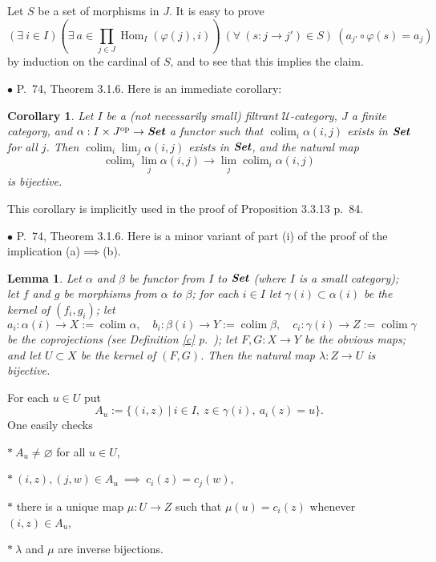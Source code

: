 \documentclass[12pt]{article}
\newtheorem{lem}[thm]{Lemma}
\newtheorem{cor}[thm]{Corollary}
\theoremstyle{remark}%
\newcommand{\bu}{\bullet}
\newcommand{\n}{\noindent}
\newcommand{\U}{\mathcal U}
\newcommand{\p}{\varphi}
\DeclareMathOperator*{\coli}{colim}
\DeclareMathOperator{\h}{Hom}
\DeclareMathOperator{\op}{op}
\begin{document}
Let $S$ be a set of morphisms in $J$. It is easy to prove 
$$
(\exists\ i\in I)\left(\exists\ a\in\prod_{j\in J}\h_I(\p(j),i)\right)\ (\forall\ (s:j\to j')\in S)\ (a_{j'}\circ\p(s)=a_j) 
$$ 
by induction on the cardinal of $S$, and to see that this implies the claim. 


\n$\bu$ P.~74, Theorem 3.1.6. Here is an immediate corollary: 
%
\begin{cor}\label{316}
Let $I$ be a (not necessarily small) filtrant $\U$-category, $J$ a finite category, and $\alpha:I\times J^{\op}\to\textbf{\em Set}$ a functor such that $\coli_i\alpha(i,j)$ exists in $\textbf{\em Set}$ for all $j$. Then $\coli_i\lim_j\alpha(i,j)$ exists in $\textbf{\em Set}$, and the natural map 
$$
\coli_i\lim_j\alpha(i,j)\to
\lim_j\coli_i\alpha(i,j)
$$ 
is bijective. 
\end{cor}
%
This corollary is implicitly used in the proof of Proposition 3.3.13 p.~84. 


\n$\bu$ P.~74, Theorem 3.1.6. Here is a minor variant of part (i) of the proof of the implication (a)$\implies$(b).\smallskip 

\begin{lem} 
Let $\alpha$ and $\beta$ be functor from $I$ to $\textbf{\em Set}$ (where $I$ is a small category); let $f$ and $g$ be morphisms from $\alpha$ to $\beta$; for each $i\in I$ let $\gamma(i)\subset\alpha(i)$ be the kernel of $(f_i,g_i)$; let 
$$
a_i:\alpha(i)\to X:=\coli\alpha,\quad 
b_i:\beta(i)\to Y:=\coli\beta,\quad 
c_i:\gamma(i)\to Z:=\coli\gamma
$$ 
be the coprojections (see Definition \ref{c} p.~\pageref{c}); let $F,G:X\to Y$ be the obvious maps; and let $U\subset X$ be the kernel of $(F,G)$. Then the natural map $\lambda:Z\to U$ is bijective.
\end{lem}
% 
\n{\em Proof.} For each $u\in U$ put 
$$
A_u:=\{(i,z)\ |\ i\in I,\ z\in\gamma(i),\ a_i(z)=u\}.
$$ 
One easily checks 

\n$*\ A_u\ne\varnothing$ for all $u\in U$,

\n$*\ (i,z),(j,w)\in A_u\ \implies\ c_i(z)=c_j(w)$, 

\n$*$ there is a unique map $\mu:U\to Z$ such that $\mu(u)=c_i(z)$ whenever $(i,z)\in A_u$,

\n$*\ \lambda$ and $\mu$ are inverse bijections. 

\end{document}
